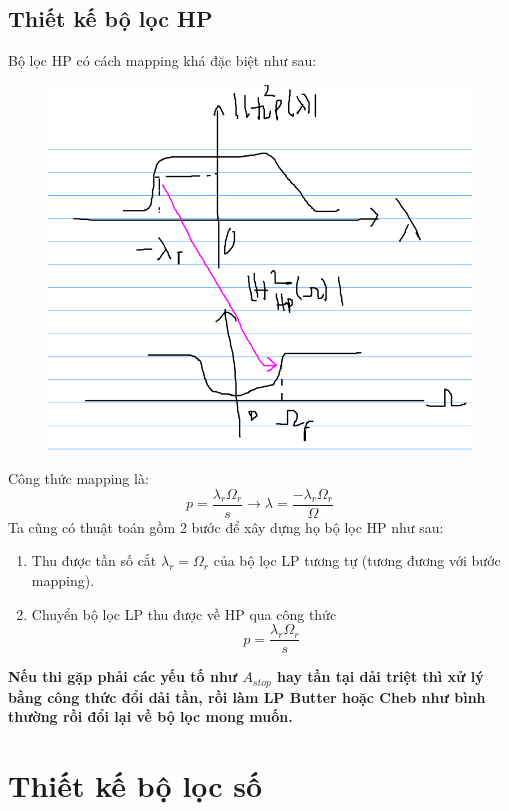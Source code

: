 \documentclass{article}
\begin{document}
\subsection{Thiết kế bộ lọc HP}
Bộ lọc HP có cách mapping khá đặc biệt như sau:
\begin{figure}[H]
  \begin{center}
  \includegraphics[width=14cm]{13.png}
  \end{center}
  \end{figure}
Công thức mapping là:
$$p=\frac{\lambda_{r}\Omega_{r}}{s}\rightarrow \lambda=\frac{-\lambda_{r}\Omega_{r}}{\Omega}$$
Ta cũng có thuật toán gồm 2 bước để xây dựng họ bộ lọc HP như sau:
\begin{enumerate}
    \item Thu được tần số cắt $\lambda_{r}=\Omega_{r}$ của bộ lọc LP tương tự (tương đương với bước mapping).
    \item Chuyển bộ lọc LP thu được về HP qua công thức $$p=\frac{\lambda_{r}\Omega_{r}}{s}$$
\end{enumerate}
\textbf{Nếu thi gặp phải các yếu tố như $A_{stop}$ hay tần tại dải triệt thì xử lý bằng công thức đổi dải tần, rồi làm LP Butter hoặc Cheb như bình thường rồi đổi lại về bộ lọc mong muốn.}
\section{Thiết kế bộ lọc số}
\end{document}
